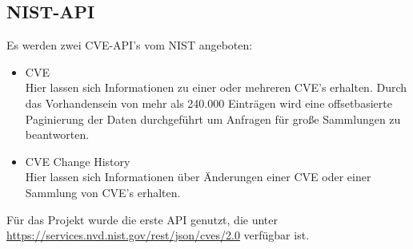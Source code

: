 \subsection{NIST-API} \label{sec:NIST-API}
Es werden zwei CVE-API's vom NIST angeboten:
\begin{itemize}
    \item CVE \\
    Hier lassen sich Informationen zu einer oder mehreren CVE's erhalten.
    Durch das Vorhandensein von mehr als 240.000 Einträgen wird eine offsetbasierte Paginierung der Daten durchgeführt um Anfragen für große Sammlungen zu beantworten.
    \item CVE Change History \\
    Hier lassen sich Informationen über Änderungen einer CVE oder einer Sammlung von CVE's erhalten.
\end{itemize}
Für das Projekt wurde die erste API genutzt, die unter \href{https://services.nvd.nist.gov/rest/json/cves/2.0}{https://services.nvd.nist.gov/rest/json/cves/2.0} verfügbar ist.